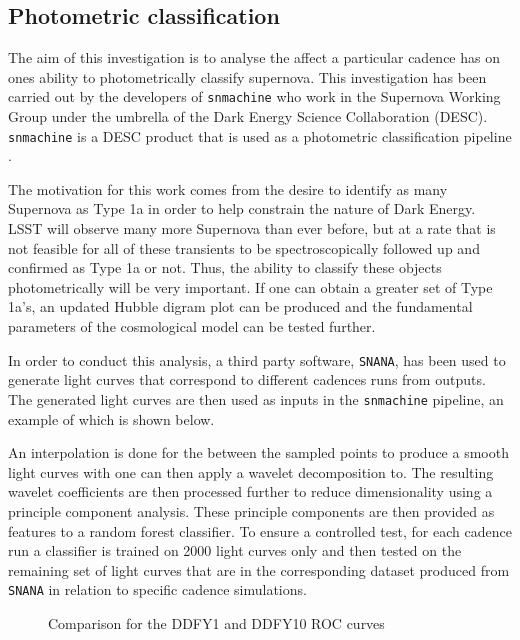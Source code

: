 \subsection{Photometric classification}


The aim of this investigation is to analyse the affect a particular cadence has
on ones ability to photometrically classify supernova. This investigation has been carried out by the
developers of {\tt snmachine} who work in the Supernova Working Group under the umbrella of the Dark Energy Science
Collaboration (DESC). {\tt snmachine} is a DESC product that is used as a photometric
classification pipeline \cite{lochner2016photometric}.

The motivation for this work comes from the desire to identify as many Supernova
as Type 1a in order to help constrain the nature of Dark Energy.
LSST will observe many more Supernova than ever before, but at a rate that is
not feasible for all of these transients to be spectroscopically followed up and
confirmed as Type 1a or not.
Thus, the ability to classify these objects photometrically will be very
important. If one can obtain a greater set of Type 1a's, an updated Hubble
digram plot can be produced and the fundamental parameters of the cosmological
model can be tested further.

In order to conduct this analysis, a third
party software, {\tt SNANA}, has been used to generate light curves that correspond to
different cadences runs from \opsim outputs. The generated light curves are
then used as inputs in the {\tt snmachine} pipeline, an example of which is
shown below.

An interpolation is done for the between the sampled points to produce a smooth
light curves with one can then apply a wavelet decomposition to. The resulting
wavelet coefficients are then processed further to reduce dimensionality using a
principle component analysis. These principle components are then
provided as features to a random forest classifier. To ensure a controlled test,
for each cadence run a classifier is trained on 2000 light
curves only and then tested on the remaining set of light curves that are in the
corresponding dataset produced from {\tt SNANA} in relation to specific \opsim cadence
simulations. 


\begin{figure}
  \centering
   \caption{Comparison for the DDFY1 and DDFY10 ROC curves}\label{fig:rocs}
\end{figure}

